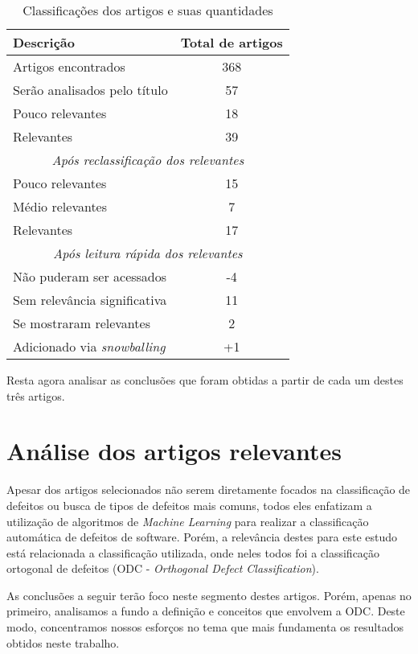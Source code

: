 \begin{table}[H]
    \centering
    \begin{tabular}{ l|c }
        Descrição & Total de artigos \\
        \hline
        Artigos encontrados & 368 \\
        \hline
        Serão analisados pelo título & 57 \\
        \hline
        Pouco relevantes & 18 \\
        Relevantes & 39 \\
        \hline
        \multicolumn{2}{c}{\textit{Após reclassificação dos relevantes}}\\
        \hline
        Pouco relevantes & 15 \\
        Médio relevantes & 7 \\
        Relevantes & 17 \\
        \hline
        \multicolumn{2}{c}{\textit{Após leitura rápida dos relevantes}}\\
        \hline
        Não puderam ser acessados & -4 \\
        Sem relevância significativa & 11 \\
        Se mostraram relevantes & 2 \\
        \hline
        Adicionado via \textit{snowballing} & +1 \\
    \end{tabular}
    \caption{Classificações dos artigos e suas quantidades}
    \label{table:reading_results}
\end{table}

Resta agora analisar as conclusões que foram obtidas a partir de cada um destes três artigos.

\section{Análise dos artigos relevantes}

Apesar dos artigos selecionados não serem diretamente focados na classificação de defeitos ou busca de tipos de defeitos mais comuns, todos eles enfatizam a utilização de algoritmos de \textit{Machine Learning} para realizar a classificação automática de defeitos de software. Porém, a relevância destes para este estudo está relacionada a classificação utilizada, onde neles todos foi a classificação ortogonal de defeitos (ODC - \textit{Orthogonal Defect Classification}).

As conclusões a seguir terão foco neste segmento destes artigos. Porém, apenas no primeiro, analisamos a fundo a definição e conceitos que envolvem a ODC. Deste modo, concentramos nossos esforços no tema que mais fundamenta os resultados obtidos neste trabalho.

